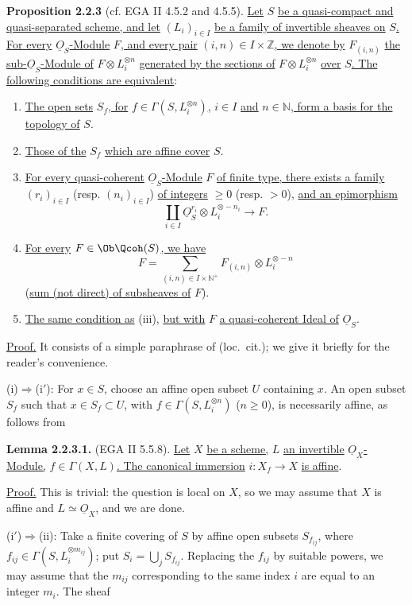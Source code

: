 \textbf{Proposition 2.2.3} (cf. EGA II 4.5.2 and 4.5.5). \uline{Let} $S$ \uline{be a quasi-compact and quasi-separated scheme, and let} $(L_i)_{i\in I}$ \uline{be a family of invertible sheaves on} $S$\uline{. For every} $\underline{O}_S$\uline{-Module} $F$\uline{, and every pair} $(i,n)\in I\times\mathbb Z$\uline{, we denote by} $F_{(i,n)}$ \uline{the sub-}$\underline{O}_S$\uline{-Module of} $F\otimes L_i^{\otimes n}$ \uline{generated by the sections of} $F\otimes L_i^{\otimes n}$ \uline{over} $S$\uline{. The following conditions are equivalent}:
\begin{enumerate}
\item[(i)] %
\uline{The
open sets} $S_f$\uline{, for} $f\in\Gamma(S,L_i^{\otimes n})$\uline{,} $i\in I$ \uline{and} $n\in\mathbb N$\uline{, form a basis for the topology of} $S$.
\item[(i$'$)] \uline{Those of the} $S_f$ \uline{which are affine cover} $S$.
\item[(ii)] \uline{For every quasi-coherent} $\underline{O}_S$\uline{-Module} $F$ \uline{of finite type, there exists a family} $(r_i)_{i\in I}$ (resp. $(n_i)_{i\in I}$) \uline{of integers} $\ge0$ (resp. $>0$), \uline{and an epimorphism}
\[
\coprod_{i\in I}\underline{O}_S^{r_i}\otimes L_i^{\otimes-n_i}\longrightarrow F.
\]
\item[(iii)] \uline{For every} $F\in\Ob\Qcoh(S)$\uline{, we have}
\[
F=\sum_{(i,n)\in I\times\mathbb N^+}F_{(i,n)}\otimes L_i^{\otimes-n}
\]
(\uline{sum (not direct) of subsheaves of} $F$).
\item[(iii$'$)] \uline{The same condition as} (iii), \uline{but with} $F$ \uline{a quasi-coherent Ideal of} $\underline{O}_S$.
\end{enumerate}

\uline{Proof.} It consists of a simple paraphrase of (loc.\ cit.); we give it briefly for the reader's convenience.

(i)$\Rightarrow$(i$'$): For $x\in S$, choose an affine open subset $U$ containing $x$. An open subset $S_f$ such that $x\in S_f\subset U$, with $f\in\Gamma(S,L_i^{\otimes n})$ ($n\ge0$), is necessarily affine, as follows from

\textbf{Lemma 2.2.3.1.} (EGA II 5.5.8). \uline{Let} $X$ \uline{be a scheme,} $L$ \uline{an invertible} $\underline{O}_X$\uline{-Module,} $f\in\Gamma(X,L)$\uline{. The canonical immersion} $i:X_f\to X$ \uline{is affine}.

\uline{Proof.} This is trivial: the question is local on $X$, so we may assume that $X$ is affine and $L\simeq\underline{O}_X$, and we are done.

(i$'$)$\Rightarrow$(ii): Take a finite covering of $S$ by affine open subsets $S_{f_{ij}}$, where $f_{ij}\in\Gamma(S,L_i^{\otimes m_{ij}})$; put $S_i=\bigcup_j S_{f_{ij}}$. Replacing the $f_{ij}$ by suitable powers, we may assume that the $m_{ij}$ corresponding to the same index $i$ are equal to an integer $m_i$. The sheaf
